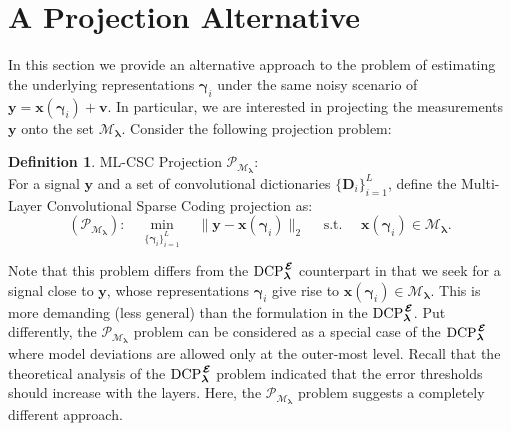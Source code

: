 \documentclass[10pt,journal]{IEEEtran}
\def\x{{\mathbf x}}
\def\v{{\mathbf v}}
\def\y{{\mathbf y}}
\def\D{{\mathbf D}}
\def\M{{\mathcal{M}}}
\def\P{{\mathcal{P}}}
\def\gama{{\boldsymbol \gamma}}
\def\lamda{{\boldsymbol \lambda}}
\def\vps{{\bm{\mathbf{\mathcal{E}}}}}
\def\DCPE{{\text{DCP}_\lamda^{\hspace{0.04cm} \vps}}}
\def\MEP{{\text{M}\vps\text{P}}}
\def\PM{{\P_{\M_\lamda}}}
\theoremstyle{plain}
\theoremstyle{definition}
\newtheorem{defn}[thm]{Definition} %
\begin{document}



\section{A Projection Alternative}
\label{sec:Projection}

In this section we provide an alternative approach to the problem of estimating the underlying representations $\gama_i$ under the same noisy scenario of $\y = \x(\gama_i) + \v$. In particular, we are interested in projecting the measurements $\y$ onto the set $\M_\lamda$. 
Consider the following projection problem:

\begin{defn}{ML-CSC Projection $\P_{\M_\lamda}$:}\\
	For a signal $\y$ and a set of convolutional dictionaries $\{ \D_i \}_{i=1}^L$, define the Multi-Layer Convolutional Sparse Coding projection as:
	\begin{equation}
	 (\PM): \quad \min_{\{\gama_i\}_{i=1}^L} \quad \| \y - \x(\gama_i) \|_2 \quad \text{ s.t. } \quad \x(\gama_i) \in \M_\lamda.
	\label{Eq:PMproblem}
	\end{equation}
\end{defn}
\noindent
Note that this problem differs from the $\DCPE$ counterpart in that we seek for a signal close to $\y$, whose representations $\gama_i$ give rise to $\x(\gama_i) \in \M_{\lamda}$. This is more demanding (less general) than the formulation in the $\DCPE$. %
Put differently, the $\PM$ problem can be considered %
as a special case of the $\DCPE$ where model deviations are allowed only at the outer-most level. %
Recall that the theoretical analysis of the $\DCPE$ problem indicated that the error thresholds should increase with the layers. Here, the $\PM$ problem suggests a completely different approach.
\end{document}
